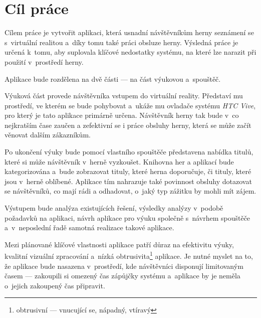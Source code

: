 \chapter{Cíl práce}\label{cuxedl-pruxe1ce}

Cílem práce je vytvořit aplikaci, která usnadní návštěvníkům
herny seznámení se s~virtuální realitou a~díky tomu také práci obsluze herny.
Výsledná práce je určená k~tomu, aby suplovala klíčové nedostatky
systému, na které lze narazit při použití v~prostředí herny.

Aplikace bude rozdělena na dvě části --- na část výukovou a~spouštěč.

Výuková část provede návštěvníka vstupem do virtuální reality. Představí mu prostředí, ve kterém se bude pohybovat a~ukáže mu ovladače systému \emph{HTC Vive}, pro který je tato aplikace
primárně určena. Návštěvník herny tak bude v~co nejkratším čase zaučen a
zefektivní se i práce obsluhy herny, která se může začít věnovat dalším zákazníkům.

Po ukončení výuky bude pomocí vlastního spouštěče představena nabídka
titulů, které si může návštěvník v~herně vyzkoušet. Knihovna her a
aplikací bude kategorizována a~bude zobrazovat tituly, které
herna doporučuje, či tituly, které jsou v~herně oblíbené. Aplikace tím nahrazuje také povinnost obsluhy dotazovat se návštěvníků, co mají rádi a
odhadovat, o~jaký typ zážitku by mohli mít zájem.

\newpage

Výstupem bude analýza existujících řešení, výsledky analýzy v~podobě
požadavků na aplikaci, návrh aplikace pro výuku společně s~návrhem
spouštěče a~v~neposlední řadě samotná realizace takové aplikace.

Mezi plánované klíčové vlastnosti aplikace patří důraz na efektivitu výuky,
kvalitní vizuální zpracování a~nízká obtrusivita\footnote{obtrusivní --- vnucující se, nápadný, vtíravý} aplikace. Je nutné
myslet na to, že aplikace bude nasazena v~prostředí, kde návštěvníci
disponují limitovaným časem --- zakoupili si omezený čas zápůjčky systému
a~aplikace by je neměla o~jejich zakoupený čas připravit.
